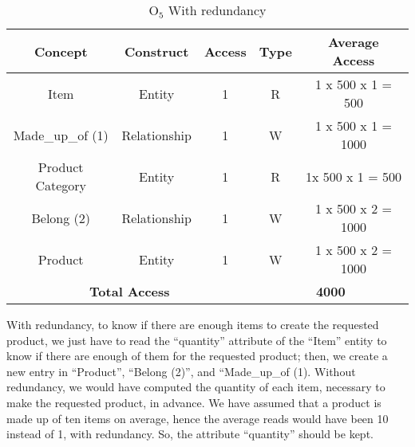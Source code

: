 \begin{table}[!h]\caption{	$ \textrm{O}_\textrm{5} $ With redundancy }
	\begin{center}
		\begin{tabular}{| c | c | c | c | c |}
			\hline
			\textbf{Concept} & \textbf{Construct} & \textbf{Access} & \textbf{Type} & \textbf{Average Access} \\ \hline
			Item & Entity & 1 & R & 1 x 500 x 1 = 500 \\ \hline
			Made\_up\_of (1) & Relationship & 1 & W & 1 x 500 x 1 = 1000 \\ \hline
			Product Category & Entity & 1 & R & 1x 500 x 1 = 500 \\ \hline
			Belong (2) & Relationship & 1 & W & 1 x 500 x 2 = 1000 \\ \hline
			Product & Entity & 1 & W & 1 x 500 x 2 = 1000 \\ \hline
			\multicolumn{3}{|c|}{\textbf{Total Access}} & \multicolumn{2}{|c|}{\textbf{4000}} \\ \hline
		\end{tabular}
	\end{center}
\end{table}
\newpage
With redundancy, to know if there are enough items to create the requested product, we just have to read the ``quantity'' attribute of the ``Item'' entity to know if there are enough of them for the requested product; then, we create a new entry in ``Product'', ``Belong (2)'', and ``Made\_up\_of (1). Without redundancy, we would have computed the quantity of each item, necessary to make the requested product, in advance. We have assumed that a product is made up of ten items on average, hence the average reads would have been 10 instead of 1, with redundancy. So, the attribute ``quantity'' should be kept.